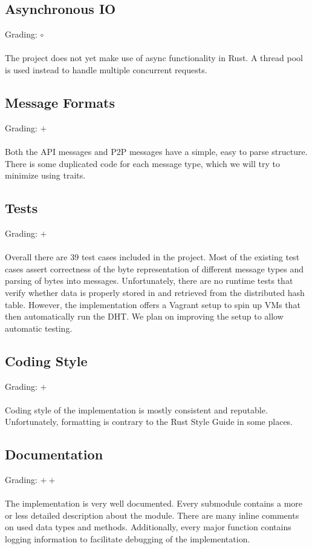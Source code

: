 \documentclass[a4paper, 11pt]{article}
\begin{document}
\subsection*{Asynchronous IO}
Grading: $\circ$\\
\\
The project does not yet make use of async functionality in Rust.
A thread pool is used instead to handle multiple concurrent requests.


\subsection*{Message Formats}
Grading: $+$\\
\\
Both the API messages and P2P messages have a simple, easy to parse structure.
There is some duplicated code for each message type, which we will try to minimize using traits.


\subsection*{Tests}
Grading: $+$\\
\\
Overall there are 39 test cases included in the project.
Most of the existing test cases assert correctness of the byte representation of different message types and parsing of bytes into messages.
Unfortunately, there are no runtime tests that verify whether data is properly stored in and retrieved from the distributed hash table.
However, the implementation offers a Vagrant setup to spin up VMs that then automatically run the DHT.
We plan on improving the setup to allow automatic testing.

\subsection*{Coding Style}
Grading: $+$\\
\\
Coding style of the implementation is mostly consistent and reputable.
Unfortunately, formatting is contrary to the Rust Style Guide \cite{RustStyleGuide} in some places.


\subsection*{Documentation}
Grading: $++$\\
\\
The implementation is very well documented.
Every submodule contains a more or less detailed description about the module.
There are many inline comments on used data types and methods.
Additionally, every major function contains logging information to facilitate debugging of the implementation.
\end{document}
